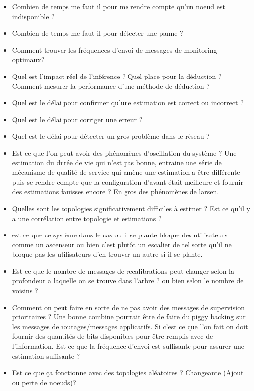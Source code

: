 \begin{itemize}
	\item Combien de temps me faut il pour me rendre compte qu'un noeud est indisponible ?
	\item Combien de temps me faut il pour détecter une panne ?
	\item Comment trouver les fréquences d'envoi de messages de monitoring optimaux?
	\item Quel est l'impact réel de l'inférence ? Quel place pour la déduction ? Comment mesurer la performance d'une méthode de déduction ?
	\item Quel est le délai pour confirmer qu'une estimation est correct ou incorrect ?
	\item Quel est le délai pour corriger une erreur ?
	\item Quel est le délai pour détecter un gros problème dans le réseau ?
	\item Est ce que l'on peut avoir des phénomènes d'oscillation du système ? Une estimation
	du durée de vie qui n'est pas bonne, entraine une série de mécanisme de qualité de service qui amène une estimation a être différente puis se rendre compte que la configuration d'avant était meilleure et fournir des estimations fauisses encore ? En gros des phénomènes de larsen.
	\item Quelles sont les topologies significativement difficiles à estimer ? Est ce qu'il y a une corrélation entre topologie et estimations ?

	\item est ce que ce système dans le cas ou il se plante bloque des utilisateurs comme
	un ascenseur ou bien c'est plutôt un escalier de tel sorte qu'il ne bloque pas les utilisateurs d'en trouver un autre si il se plante.

	\item Est ce que le nombre de messages de recalibrations peut changer selon la profondeur a laquelle on se trouve dans l'arbre ? ou bien selon le nombre de voisins ?

	\item Comment on peut faire en sorte de ne pas avoir des messages de supervision prioritaires ? Une bonne combine pourrait être de faire du piggy backing sur les messages de routages/messages applicatifs. Si c'est ce que l'on fait on doit fournir des quantités de bits disponibles pour être remplis avec de l'information. Est ce que la fréquence d'envoi est suffisante pour assurer une estimation suffisante ?

	\item Est ce que ça fonctionne avec des topologies aléatoires ? Changeante (Ajout ou perte de noeuds)?

\end{itemize}


